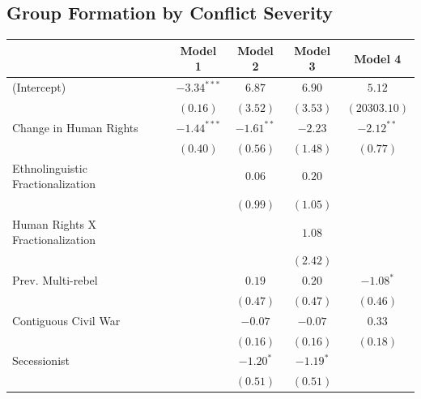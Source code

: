 \documentclass[12pt,]{book}
\let\origtable\table
\let\endorigtable\endtable
\renewenvironment{table}[1][2] {
    \singlespacing
    \expandafter\origtable\expandafter[H]
} {
    \endorigtable
}
\theoremstyle{definition}
\theoremstyle{definition}
\theoremstyle{definition}
\theoremstyle{remark}
\begin{document}
\hypertarget{group-formation-by-conflict-severity}{%
\subsection*{Group Formation by Conflict
Severity}\label{group-formation-by-conflict-severity}}

\begin{table}
\begin{center}
\begin{tabular}{l c c c c }
\hline
 & Model 1 & Model 2 & Model 3 & Model 4 \\
\hline
(Intercept)                       & $-3.34^{***}$ & $6.87$       & $6.90$      & $5.12$       \\
                                  & $(0.16)$      & $(3.52)$     & $(3.53)$    & $(20303.10)$ \\
Change in Human Rights            & $-1.44^{***}$ & $-1.61^{**}$ & $-2.23$     & $-2.12^{**}$ \\
                                  & $(0.40)$      & $(0.56)$     & $(1.48)$    & $(0.77)$     \\
Ethnolinguistic Fractionalization &               & $0.06$       & $0.20$      &              \\
                                  &               & $(0.99)$     & $(1.05)$    &              \\
Human Rights X Fractionalization  &               &              & $1.08$      &              \\
                                  &               &              & $(2.42)$    &              \\
Prev. Multi-rebel                 &               & $0.19$       & $0.20$      & $-1.08^{*}$  \\
                                  &               & $(0.47)$     & $(0.47)$    & $(0.46)$     \\
Contiguous Civil War              &               & $-0.07$      & $-0.07$     & $0.33$       \\
                                  &               & $(0.16)$     & $(0.16)$    & $(0.18)$     \\
Secessionist                      &               & $-1.20^{*}$  & $-1.19^{*}$ &              \\
                                  &               & $(0.51)$     & $(0.51)$    &              \\

\end{tabular}
\end{center}
\end{table}
\end{document}
